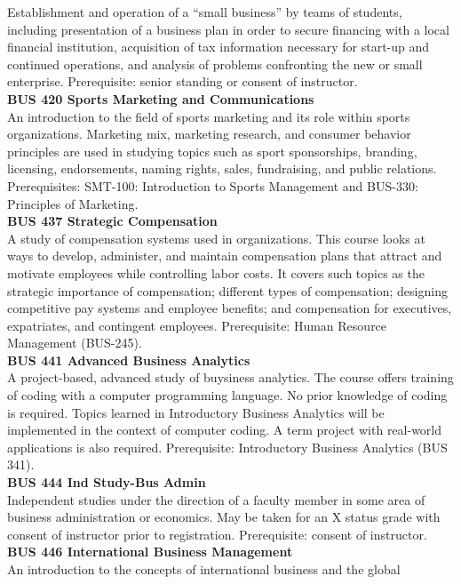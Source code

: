 \documentclass[
  letterpaper,
]{scrbook}
\begin{document}
Establishment and operation of a ``small business'' by teams of
students, including presentation of a business plan in order to secure
financing with a local financial institution, acquisition of tax
information necessary for start-up and continued operations, and
analysis of problems confronting the new or small enterprise.
Prerequisite: senior standing or consent of instructor.\\
\textbf{BUS 420 Sports Marketing and Communications}\\
An introduction to the field of sports marketing and its role within
sports organizations. Marketing mix, marketing research, and consumer
behavior principles are used in studying topics such as sport
sponsorships, branding, licensing, endorsements, naming rights, sales,
fundraising, and public relations. Prerequisites: SMT-100: Introduction
to Sports Management and BUS-330: Principles of Marketing.\\
\textbf{BUS 437 Strategic Compensation}\\
A study of compensation systems used in organizations. This course looks
at ways to develop, administer, and maintain compensation plans that
attract and motivate employees while controlling labor costs. It covers
such topics as the strategic importance of compensation; different types
of compensation; designing competitive pay systems and employee
benefits; and compensation for executives, expatriates, and contingent
employees. Prerequisite: Human Resource Management (BUS-245).\\
\textbf{BUS 441 Advanced Business Analytics}\\
A project-based, advanced study of buysiness analytics. The course
offers training of coding with a computer programming language. No prior
knowledge of coding is required. Topics learned in Introductory Business
Analytics will be implemented in the context of computer coding. A term
project with real-world applications is also required. Prerequisite:
Introductory Business Analytics (BUS 341).\\
\textbf{BUS 444 Ind Study-Bus Admin}\\
Independent studies under the direction of a faculty member in some area
of business administration or economics. May be taken for an X status
grade with consent of instructor prior to registration. Prerequisite:
consent of instructor.\\
\textbf{BUS 446 International Business Management}\\
An introduction to the concepts of international business and the global
\end{document}
